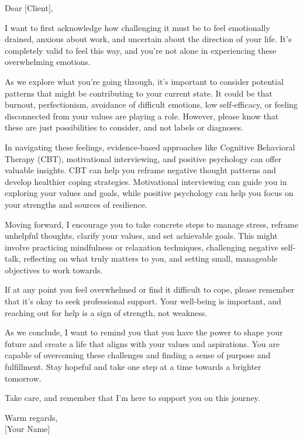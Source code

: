 \begin{tcolorbox}[outputbox gpt={GPT-4.1 (Rank 1 augmentation) Run 1}]
\small
Dear [Client],

I want to first acknowledge how challenging it must be to feel emotionally drained, anxious about work, and uncertain about the direction of your life. It's completely valid to feel this way, and you're not alone in experiencing these overwhelming emotions.

As we explore what you're going through, it's important to consider potential patterns that might be contributing to your current state. It could be that burnout, perfectionism, avoidance of difficult emotions, low self-efficacy, or feeling disconnected from your values are playing a role. However, please know that these are just possibilities to consider, and not labels or diagnoses.

In navigating these feelings, evidence-based approaches like Cognitive Behavioral Therapy (CBT), motivational interviewing, and positive psychology can offer valuable insights. CBT can help you reframe negative thought patterns and develop healthier coping strategies. Motivational interviewing can guide you in exploring your values and goals, while positive psychology can help you focus on your strengths and sources of resilience.

Moving forward, I encourage you to take concrete steps to manage stress, reframe unhelpful thoughts, clarify your values, and set achievable goals. This might involve practicing mindfulness or relaxation techniques, challenging negative self-talk, reflecting on what truly matters to you, and setting small, manageable objectives to work towards.

If at any point you feel overwhelmed or find it difficult to cope, please remember that it's okay to seek professional support. Your well-being is important, and reaching out for help is a sign of strength, not weakness.

As we conclude, I want to remind you that you have the power to shape your future and create a life that aligns with your values and aspirations. You are capable of overcoming these challenges and finding a sense of purpose and fulfillment. Stay hopeful and take one step at a time towards a brighter tomorrow.

Take care, and remember that I'm here to support you on this journey.

\medskip
Warm regards,\\
{[Your Name]}
\end{tcolorbox}

